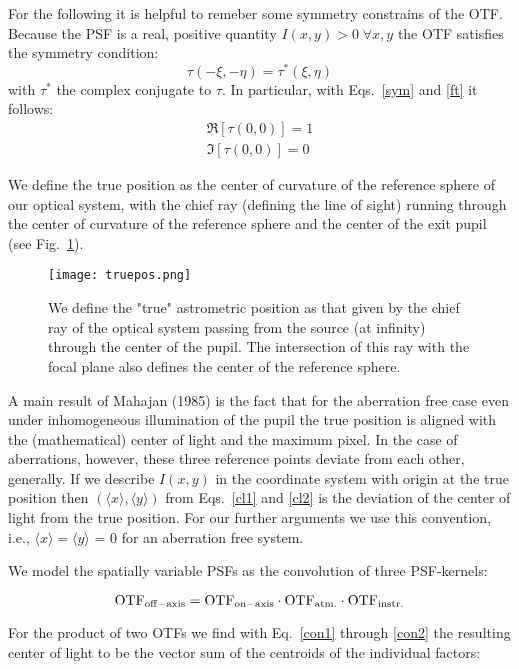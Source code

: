 \documentclass[a4paper]{article}
\begin{document}
For the following it is helpful to remeber some symmetry constrains of the OTF.
Because the PSF is a real, positive quantity $I(x,y) > 0 \; \forall x,y$ the OTF satisfies the symmetry condition:
\begin{equation}\label{sym}
\tau(-\xi, -\eta) = \tau^{\ast}(\xi,\eta)
\end{equation}
with $\tau^{\ast}$ the complex conjugate to $\tau$. In particular, with Eqs.~\ref{sym} and \ref{ft} it follows:
\begin{eqnarray}
\Re[\tau(0,0)] = 1 \\
\Im[\tau(0,0)] = 0 \label{con2}
\end{eqnarray}

We define the true position as the center of curvature of the reference sphere of our optical system, with the chief ray (defining the line of sight) running through the center of curvature of the reference sphere and the center of the exit pupil (see Fig.~\ref{fig:tp}).
\begin{figure}[h!]
\centering
\texttt{[image: truepos.png]}
\caption{\label{fig:tp}We define the "true" astrometric position as that given by the chief ray of the optical system passing from the source (at infinity) through the center of the pupil.  The intersection of this ray with the focal plane also defines the center of the reference sphere.}
\end{figure}
A main result of Mahajan (1985) is the fact that for the aberration free case even under inhomogeneous illumination of the pupil the true position is aligned with the (mathematical) center of light and the maximum pixel. In the case of aberrations, however, these three reference points deviate from each other, generally. If we describe $I(x,y)$ in the coordinate system with origin at the true position then $(\langle x \rangle, \langle y \rangle)$ from Eqs.~\ref{cl1} and \ref{cl2} is the deviation of the center of light from the true position. For our further arguments we use this convention, i.e., $\langle x \rangle = \langle y \rangle$ = 0 for an aberration free system.

We model the spatially variable PSFs as the convolution of  three PSF-kernels:

\begin{equation}
\rm{OTF}_{\rm{off-axis}} = \rm{OTF}_{\rm{on-axis}} \cdot \rm{OTF}_{\rm{atm.}} \cdot \rm{OTF}_{\rm{instr.}}
\end{equation}

For the product of two OTFs we find with Eq.~\ref{con1} through \ref{con2} the resulting center of light to be the vector sum of the centroids of the individual factors:
\end{document}
